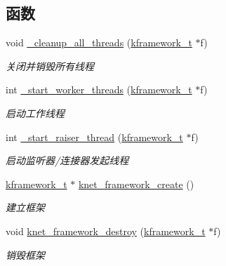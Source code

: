 \subsection*{函数}
\begin{DoxyCompactItemize}
\item 
void \hyperlink{a00055_a9c5bb6308c754d2a46ade4c7fef5907f_a9c5bb6308c754d2a46ade4c7fef5907f}{\+\_\+cleanup\+\_\+all\+\_\+threads} (\hyperlink{a00054_a3195a3be35782fc1efb920c811be111d_a3195a3be35782fc1efb920c811be111d}{kframework\+\_\+t} $\ast$f)
\begin{DoxyCompactList}\small\item\em 关闭并销毁所有线程 \end{DoxyCompactList}\item 
int \hyperlink{a00055_a1ff0491ef03493e3d3b299f4d8f64d0d_a1ff0491ef03493e3d3b299f4d8f64d0d}{\+\_\+start\+\_\+worker\+\_\+threads} (\hyperlink{a00054_a3195a3be35782fc1efb920c811be111d_a3195a3be35782fc1efb920c811be111d}{kframework\+\_\+t} $\ast$f)
\begin{DoxyCompactList}\small\item\em 启动工作线程 \end{DoxyCompactList}\item 
int \hyperlink{a00055_a23f8160552bd4b1a0bca4c2779d49a4d_a23f8160552bd4b1a0bca4c2779d49a4d}{\+\_\+start\+\_\+raiser\+\_\+thread} (\hyperlink{a00054_a3195a3be35782fc1efb920c811be111d_a3195a3be35782fc1efb920c811be111d}{kframework\+\_\+t} $\ast$f)
\begin{DoxyCompactList}\small\item\em 启动监听器/连接器发起线程 \end{DoxyCompactList}\item 
\hyperlink{a00054_a3195a3be35782fc1efb920c811be111d_a3195a3be35782fc1efb920c811be111d}{kframework\+\_\+t} $\ast$ \hyperlink{a00110_ga066683c6d9defb4121552b439d11d7ba_ga066683c6d9defb4121552b439d11d7ba}{knet\+\_\+framework\+\_\+create} ()
\begin{DoxyCompactList}\small\item\em 建立框架 \end{DoxyCompactList}\item 
void \hyperlink{a00110_gaee7016dea12793dae5e6732fb86ee8d0_gaee7016dea12793dae5e6732fb86ee8d0}{knet\+\_\+framework\+\_\+destroy} (\hyperlink{a00054_a3195a3be35782fc1efb920c811be111d_a3195a3be35782fc1efb920c811be111d}{kframework\+\_\+t} $\ast$f)
\begin{DoxyCompactList}\small\item\em 销毁框架 \end{DoxyCompactList}\item 

\end{DoxyCompactItemize}
